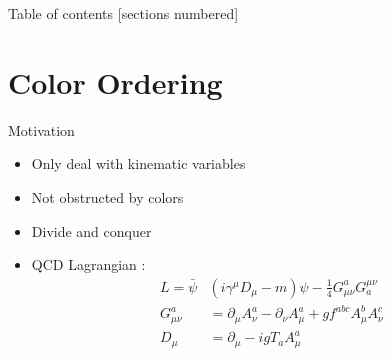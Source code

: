 \documentclass[10pt]{beamer}
\begin{document}
\begin{frame}{Table of contents}
  [sections numbered]
  \tableofcontents[hideallsubsections]
\end{frame}

\section{Color Ordering}

\begin{frame}[fragile]{Motivation}

    \begin{itemize}[<+->]
        \item Only deal with kinematic variables
        \item Not obstructed by colors
        \item Divide and conquer
        \item QCD Lagrangian \cite{eidemueller2000}:
            \begin{align*}
                L = \bar{\psi} &\left( i \gamma^{\mu} D_{\mu} - m \right) \psi - \frac{1}{4} G^{a}_{\mu \nu} G_{a}^{\mu \nu} \\
                G^{a}_{\mu \nu} &= \partial_{\mu} A^a_{\nu} - \partial_{\nu}A^a_{\mu} + g f^{abc}A^b_{\mu} A^c_{\nu} \\
                D_{\mu} &= \partial_{\mu} - ig T_a A^a_{\mu}
            \end{align*}
    \end{itemize}

\end{frame}
\end{document}
